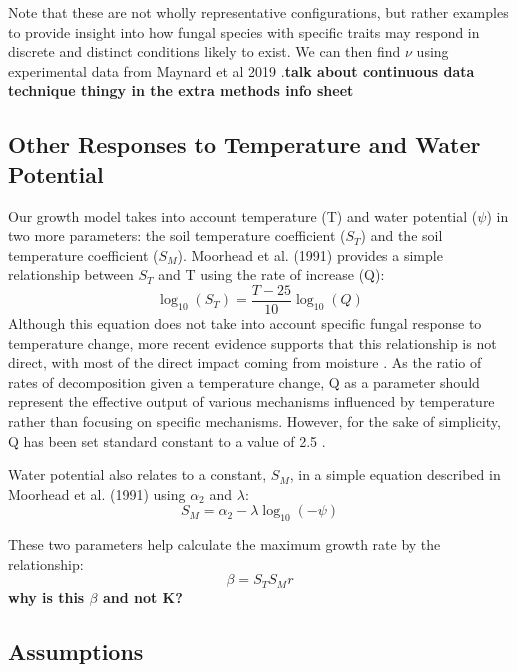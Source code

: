 \documentclass[12pt]{article}
\begin{document}
Note that these are not wholly representative configurations, but rather examples to provide insight into how fungal species with specific traits may respond in discrete and distinct conditions likely to exist. We can then find $\nu$ using experimental data from Maynard et al 2019 \cite{Maynard2019}.\textbf{talk about continuous data technique thingy in the extra methods info sheet}

\begin{multicols}{2}	
\subsection{Other Responses to Temperature and Water Potential}

Our growth model takes into account temperature (T) and water potential ($\psi$) in two more parameters: the soil temperature coefficient ($S_T$) and the soil temperature coefficient ($S_M$). Moorhead et al. (1991) provides a simple relationship between $S_T$ and T using the rate of increase (Q):
\begin{equation}
\log_{10}(S_T) = \frac{T-25}{10}\log_{10}(Q)
\end{equation}
Although this equation does not take into account specific fungal response to temperature change, more recent evidence supports that this relationship is not direct, with most of the direct impact coming from moisture \cite{Petraglia2018}. As the ratio of rates of decomposition given a temperature change, Q as a parameter should represent the effective output of various mechanisms influenced by temperature rather than focusing on specific mechanisms. However, for the sake of simplicity, Q has been set standard constant to a value of 2.5 \cite{Moorhead1991}.

Water potential also relates to a constant, $S_M$, in a simple equation described in Moorhead et al. (1991) using $\alpha_2$ and $\lambda$:
\begin{equation}
S_M = \alpha_2 -\lambda \log_{10}(-\psi)
\end{equation}

These two parameters help calculate the maximum growth rate by the relationship:
\begin{equation}
\beta = S_T S_M r
\end{equation}
\textbf{why is this $\beta$ and not K?} 

\subsection{Assumptions}


\end{multicols}
\end{document}
